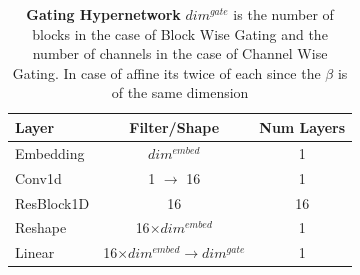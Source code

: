 \begin{table}[ht]
\caption{\textbf{Gating Hypernetwork} $dim^{gate}$ is the number of blocks in the case of Block Wise Gating and the number of channels in the case of Channel Wise Gating. In case of affine its twice of each since the $\beta$ is of the same dimension }
\centering %
\begin{tabular}{l c c} %
\toprule%
\textbf{Layer} & \textbf{Filter/Shape} & \textbf{Num Layers} \\
\midrule
Embedding & $dim^{embed}$ & 1 \\
Conv1d & 1 $\rightarrow$ 16 & 1\\
ResBlock1D & 16 & 16\\
Reshape & 16$\times dim^{embed}$ & 1\\
Linear & 16$\times dim^{embed} \rightarrow dim^{gate} $& 1\\
\bottomrule%
\end{tabular}
\label{table:resnet_gating} %
\end{table}


